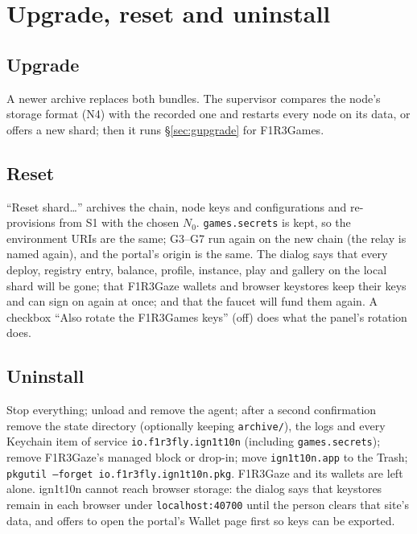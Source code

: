 \documentclass[11pt]{article}
\theoremstyle{definition}
\theoremstyle{remark}
\newcommand{\code}[1]{\texttt{#1}}
\newcommand{\Gz}{F1R3Gaze}
\newcommand{\Hr}{ign1t10n}
\newcommand{\Gm}{F1R3Games}
\begin{document}
\section{Upgrade, reset and uninstall}\label{sec:lifecycle}

\subsection{Upgrade}
A newer archive replaces both bundles. The supervisor compares the node's storage
format (N4) with the recorded one and restarts every node on its data, or offers a new
shard; then it runs \S\ref{sec:gupgrade} for \Gm{}.

\subsection{Reset}\label{sec:reset}
``Reset shard\ldots'' archives the chain, node keys and configurations and
re-provisions from S1 with the chosen $N_0$. \code{games.secrets} is kept, so the
environment URIs are the same; G3--G7 run again on the new chain (the relay is named
again), and the portal's origin is the same. The dialog says that every deploy, registry entry, balance,
profile, instance, play and gallery on the local shard will be gone; that \Gz{}
wallets and browser keystores keep their keys and can sign on again at once; and that
the faucet will fund them again. A checkbox ``Also rotate the \Gm{} keys'' (off) does
what the panel's rotation does.

\subsection{Uninstall}\label{sec:uninstall}
Stop everything; unload and remove the agent; after a second confirmation remove the
state directory (optionally keeping \code{archive/}), the logs and every Keychain
item of service \code{io.f1r3fly.ign1t10n} (including \code{games.secrets}); remove
\Gz{}'s managed block or drop-in; move \code{ign1t10n.app} to the Trash;
\code{pkgutil --forget io.f1r3fly.ign1t10n.pkg}. \Gz{} and its wallets are left
alone. \Hr{} cannot reach browser storage: the dialog says that keystores remain in
each browser under \code{localhost:40700} until the person clears that site's data,
and offers to open the portal's Wallet page first so keys can be exported.

\end{document}
